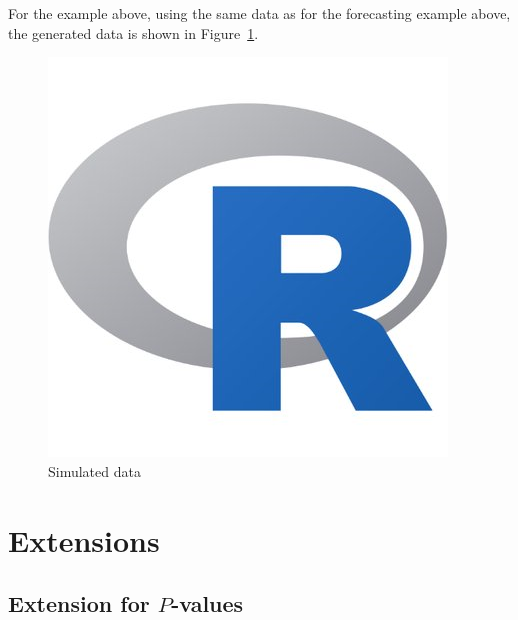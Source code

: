 \documentclass[article]{jss}
\begin{document}
For the example above, 
using the same data as for the forecasting example above, 
the generated data is shown in Figure~\ref{fig:sim}.

\begin{figure}[tbh]
  \centering
  \includegraphics[scale = 1, keepaspectratio=true]{Figures/sim.png}
  \caption{Simulated data}
  \label{fig:sim}
\end{figure}








\section{Extensions} \label{sec:extensions}




\subsection{Extension for $P$-values} \label{sec:fdpval}
\end{document}

